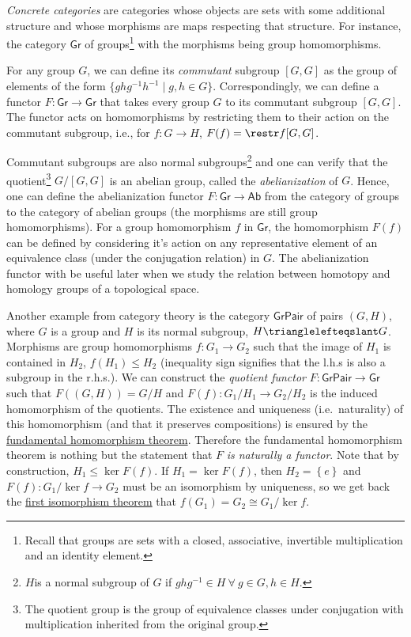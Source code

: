 \emph{Concrete categories} are categories whose objects are sets
with some additional structure and whose morphisms are maps respecting
that structure. For instance, the category $\mathsf{Gr}$ of groups\footnote{Recall that groups are sets with a closed, associative, invertible
multiplication and an identity element.} with the morphisms being group homomorphisms.
\begin{example}
For any group $G$, we can define its \emph{commutant} subgroup
$[G,G]$ as the group of elements of the form $\{ghg^{-1}h^{-1}\mid g,h\in G\}$.
Correspondingly, we can define a functor $F:\mathsf{Gr}\rightarrow\mathsf{Gr}$
that takes every group $G$ to its commutant subgroup $[G,G]$. The
functor acts on homomorphisms by restricting them to their action
on the commutant subgroup, i.e., for $f:G\rightarrow H$, $F(f)=\restr f{[G,G]}$.

Commutant subgroups are also normal subgroups\footnote{$H$is a normal subgroup of $G$ if $ghg^{-1}\in H~\forall~g\in G,h\in H$.}
and one can verify that the quotient\footnote{The quotient group is the group of equivalence classes under conjugation
with multiplication inherited from the original group.} $G/[G,G]$ is an abelian group, called the \emph{abelianization}
of $G$. Hence, one can define the abelianization functor
$F:\mathsf{Gr}\rightarrow\mathsf{Ab}$ from the category of groups
to the category of abelian groups (the morphisms are still group homomorphisms).
For a group homomorphism $f$ in $\mathsf{Gr}$, the homomorphism
$F(f)$ can be defined by considering it's action on any representative
element of an equivalence class (under the conjugation relation) in
$G$. The abelianization functor with be useful later when we study
the relation between homotopy and homology groups of a topological
space.
\end{example}
%
\begin{example}
\label{quotient functor}Another example from category theory is
the category $\mathsf{GrPair}$ of pairs $\left(G,H\right)$, where
$G$ is a group and $H$ is its normal subgroup, $H\trianglelefteqslant G$.
Morphisms are group homomorphisms $f:G_{1}\to G_{2}$ such that the
image of $H_{1}$ is contained in $H_{2}$, $f\left(H_{1}\right)\leq H_{2}$
(inequality sign signifies that the l.h.s is also a subgroup in the
r.h.s.). We can construct the \emph{quotient functor} $F:\mathsf{GrPair}\to\mathsf{Gr}$
such that $F\left(\left(G,H\right)\right)=G/H$ and $F\left(f\right):G_{1}/H_{1}\to G_{2}/H_{2}$
is the induced homomorphism of the quotients. The existence and uniqueness
(i.e.\ naturality) of this homomorphism (and that it preserves compositions)
is ensured by the \href{https://en.wikipedia.org/wiki/Fundamental_theorem_on_homomorphisms}{fundamental homomorphism theorem}.
Therefore the fundamental homomorphism theorem is nothing but the
statement that $F$\emph{ is naturally a functor}. Note that by
construction, $H_{1}\leq\ker F(f)$. If $H_{1}=\ker F\left(f\right)$,
then $H_{2}=\left\{ e\right\} $ and $F(f):G_{1}/\ker f\to G_{2}$
must be an isomorphism by uniqueness, so we get back the \href{https://en.wikipedia.org/wiki/Isomorphism_theorems\#First_isomorphism_theorem}{first isomorphism theorem}
that $f\left(G_{1}\right)=G_{2}\cong G_{1}/\ker f$.
\end{example}
